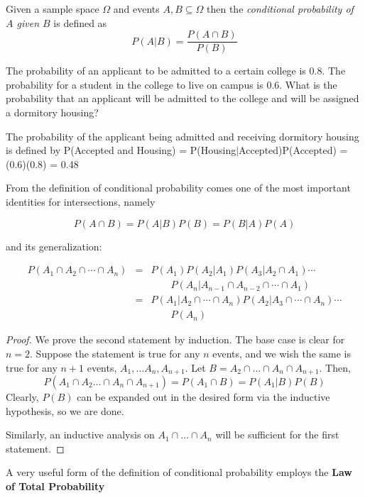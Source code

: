 \documentclass[../main.tex]{subfiles}
\begin{document}
\begin{definition}
	Given a sample space $\Omega$ and events  $A,B \subseteq \Omega$ then
	the  \textit{conditional probability of $A$ given $B$} is defined as
	\begin{equation}
	P(A | B) = \dfrac{P(A \cap B)}{P(B)}
	\end{equation}
	\label{def:condprob}
\end{definition}

\begin{example}
	The probability of an applicant to be admitted to a certain college is 0.8.
	The probability for a student in the college to live on campus is 0.6. What
	is the probability that an applicant will be admitted to the college and will
	be assigned a dormitory housing?
\end{example}
\begin{solution}
	The probability of the applicant being admitted and receiving dormitory
	housing is defined by
	P(Accepted and Housing) = P(Housing$|$Accepted)P(Accepted)
	= (0.6)(0.8) = 0.48
\end{solution}

From the definition of conditional probability comes one of the most important
identities for intersections, namely
\begin{theorem}
	$$P(A \cap B) = P(A|B)P(B) = P(B|A)P(A)$$
\end{theorem}
\noindent
and its generalization:
\begin{theorem}
	\begin{eqnarray*}
	P(A_1 \cap A_2  \cap \cdots \cap A_n) &=&	P(A_1)P(A_2 | A_1)P(A_3 | A_2 \cap A_1) \cdots \\
	&& \qquad P(A_n | A_{n-1} \cap A_{n-2} \cap 
	\cdots \cap A_1) \\
	&=& P(A_1|A_2\cap\cdots \cap A_n)P(A_2|A_3\cap\cdots \cap A_n)\cdots \\
	&& \qquad P(A_n)
	\end{eqnarray*}
\end{theorem}

\begin{proof}
	We prove the second statement by induction. The base case is clear for $n = 2$. Suppose the statement is true for any $n$ events, and we wish the same is true for any $n+1$ events, $A_1, \ldots A_n, A_{n+1}$. Let $B = A_2 \cap \ldots \cap A_n \cap A_{n+1}$. Then, 
	\[
		P(A_1 \cap A_2 \dots \cap A_n \cap A_{n+1}) = P(A_1 \cap B) = P(A_1 | B) P(B)
	\]
	Clearly, $P(B)$ can be expanded out in the desired form via the inductive hypothesis, so we are done. 
	
	Similarly, an inductive analysis on $A_1 \cap \ldots \cap A_n$ will be sufficient for the first statement. 
\end{proof}
\noindent
A very useful form of the definition of conditional probability employs the \textbf{Law
of Total Probability}
\end{document}
